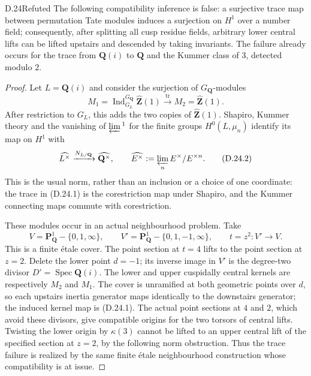 \begin{claim}{D.24}{Refuted}\label{clm:D24}
The following compatibility inference is false: a surjective trace
map between permutation Tate modules induces a surjection on
$H^1$ over a number field; consequently, after splitting all cusp
residue fields, arbitrary lower central lifts can be lifted upstairs
and descended by taking invariants.  The failure already occurs for
the trace from $\mathbf Q(i)$ to $\mathbf Q$ and the Kummer class
of $3$, detected modulo $2$.
\end{claim}
\begin{proof}
Let $L=\mathbf Q(i)$ and consider the surjection of $G_{\mathbf Q}$-modules
\[
 M_1=\operatorname{Ind}_{G_L}^{G_{\mathbf Q}}
             \widehat{\mathbf Z}(1)
   \xrightarrow{\operatorname{tr}}
 M_2=\widehat{\mathbf Z}(1).
 \tag{D.24.1}
\]
After restriction to $G_L$, this adds the two copies of
$\widehat{\mathbf Z}(1)$.  Shapiro, Kummer theory and the vanishing
of $\varprojlim{}^1$ for the finite groups $H^0(L,\mu_n)$ identify
its map on $H^1$ with
\[
 \widehat{L^\times}\xrightarrow{N_{L/\mathbf Q}}
           \widehat{\mathbf Q^\times},
 \qquad
 \widehat{E^\times}:=\varprojlim_n E^\times/E^{\times n}.
 \tag{D.24.2}
\]
This is the usual norm, rather than an inclusion or a choice of
one coordinate: the trace in (D.24.1) is the corestriction map under
Shapiro, and the Kummer connecting maps commute with corestriction.

These modules occur in an actual neighbourhood problem.  Take
\[
 V=\mathbf P^1_{\mathbf Q}-\{0,1,\infty\},\qquad
 V'=\mathbf P^1_{\mathbf Q}-\{0,1,-1,\infty\},\qquad
 t=z^2:V'\longrightarrow V.
\]
This is a finite étale cover.  The point section at $t=4$ lifts to
the point section at $z=2$.  Delete the lower point $d=-1$; its
inverse image in $V'$ is the degree-two divisor
$D'=\operatorname{Spec}\mathbf Q(i)$.  The lower and upper
cuspidally central kernels are respectively $M_2$ and $M_1$.
The cover is unramified at both geometric points over $d$, so each
upstairs inertia generator maps identically to the downstairs
generator; the induced kernel map is (D.24.1).  The actual point
sections at $4$ and $2$, which avoid these divisors, give compatible
origins for the two torsors of central lifts.  Twisting the lower
origin by $\kappa(3)$ cannot be lifted to an upper central lift of
the specified section at $z=2$, by the following norm obstruction.
Thus the trace failure is realized by the same finite étale
neighbourhood construction whose compatibility is at issue.


\end{proof}
